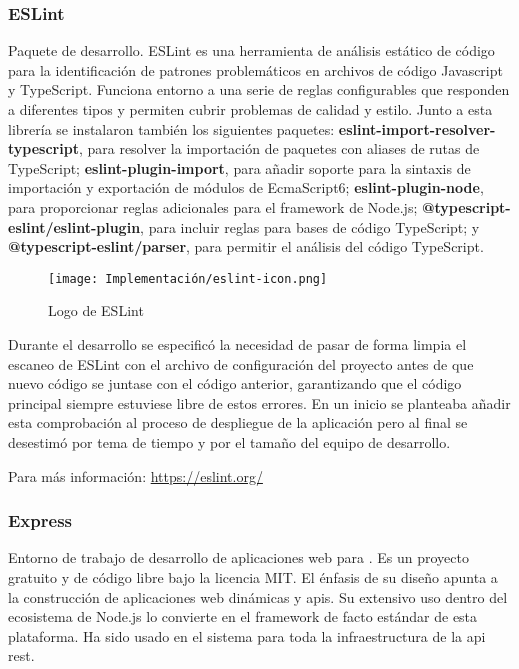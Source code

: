 \subsubsection{ESLint}
\label{lib:api:eslint}
Paquete de desarrollo. ESLint es una herramienta de análisis estático de código para la identificación de patrones problemáticos en archivos de código Javascript y TypeScript. Funciona entorno a una serie de reglas configurables que responden a diferentes tipos y permiten cubrir problemas de calidad y estilo. Junto a esta librería se instalaron también los siguientes paquetes: \textbf{eslint-import-resolver-typescript}, para resolver la importación de paquetes con aliases de rutas de TypeScript; \textbf{eslint-plugin-import}, para añadir soporte para la sintaxis de importación y exportación de módulos de EcmaScript6\cite{ecma262}; \textbf{eslint-plugin-node}, para proporcionar reglas adicionales para el framework de Node.js; \textbf{@typescript-eslint/eslint-plugin}, para incluir reglas para bases de código TypeScript; y \textbf{@typescript-eslint/parser}, para permitir el análisis del código TypeScript.

\begin{wrapfigure}[6]{l}{0.2\textwidth}
    \vspace{-20pt}
    \centering
    \texttt{[image: Implementación/eslint-icon.png]}
    \vspace{-15pt}
    \caption{Logo de ESLint}
\end{wrapfigure}

Durante el desarrollo se especificó la necesidad de pasar de forma limpia el escaneo de ESLint con el archivo de configuración del proyecto antes de que nuevo código se juntase con el código anterior, garantizando que el código principal siempre estuviese libre de estos errores. En un inicio se planteaba añadir esta comprobación al proceso de despliegue de la aplicación pero al final se desestimó por tema de tiempo y por el tamaño del equipo de desarrollo. 

Para más información: \href{https://eslint.org/}{https://eslint.org/}

\subsubsection{Express}
\label{lib:api:express}

Entorno de trabajo de desarrollo de aplicaciones web para . Es un proyecto gratuito y de código libre bajo la licencia MIT. El énfasis de su diseño apunta a la construcción de aplicaciones web dinámicas y \acrshort{api}s. Su extensivo uso dentro del ecosistema de Node.js lo convierte en el framework de facto estándar de esta plataforma. Ha sido usado en el sistema para toda la infraestructura de la \acrshort{api} \acrshort{rest}.

